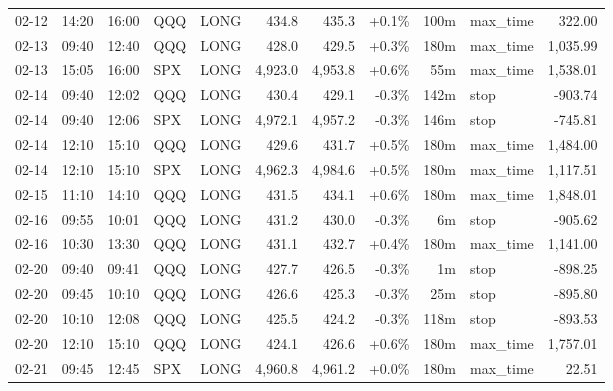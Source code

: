 \documentclass[11pt,a4paper,twoside]{article}
\begin{document}
\begin{center}
\begin{longtable}{>{\color{txtmain}}l l l l l r r r r >{\color{txtmain}}l r}
02-12 & 14:20 & 16:00 & QQQ & LONG & 434.8 & 435.3 & \textcolor{wingreen}{+0.1\%} & 100m & max\_time & \textcolor{wingreen}{322.00} \\
02-13 & 09:40 & 12:40 & QQQ & LONG & 428.0 & 429.5 & \textcolor{wingreen}{+0.3\%} & 180m & max\_time & \textcolor{wingreen}{1,035.99} \\
02-13 & 15:05 & 16:00 & SPX & LONG & 4,923.0 & 4,953.8 & \textcolor{wingreen}{+0.6\%} & 55m & max\_time & \textcolor{wingreen}{1,538.01} \\
02-14 & 09:40 & 12:02 & QQQ & LONG & 430.4 & 429.1 & \textcolor{lossred}{-0.3\%} & 142m & stop & \textcolor{lossred}{-903.74} \\
02-14 & 09:40 & 12:06 & SPX & LONG & 4,972.1 & 4,957.2 & \textcolor{lossred}{-0.3\%} & 146m & stop & \textcolor{lossred}{-745.81} \\
02-14 & 12:10 & 15:10 & QQQ & LONG & 429.6 & 431.7 & \textcolor{wingreen}{+0.5\%} & 180m & max\_time & \textcolor{wingreen}{1,484.00} \\
02-14 & 12:10 & 15:10 & SPX & LONG & 4,962.3 & 4,984.6 & \textcolor{wingreen}{+0.5\%} & 180m & max\_time & \textcolor{wingreen}{1,117.51} \\
02-15 & 11:10 & 14:10 & QQQ & LONG & 431.5 & 434.1 & \textcolor{wingreen}{+0.6\%} & 180m & max\_time & \textcolor{wingreen}{1,848.01} \\
02-16 & 09:55 & 10:01 & QQQ & LONG & 431.2 & 430.0 & \textcolor{lossred}{-0.3\%} & 6m & stop & \textcolor{lossred}{-905.62} \\
02-16 & 10:30 & 13:30 & QQQ & LONG & 431.1 & 432.7 & \textcolor{wingreen}{+0.4\%} & 180m & max\_time & \textcolor{wingreen}{1,141.00} \\
02-20 & 09:40 & 09:41 & QQQ & LONG & 427.7 & 426.5 & \textcolor{lossred}{-0.3\%} & 1m & stop & \textcolor{lossred}{-898.25} \\
02-20 & 09:45 & 10:10 & QQQ & LONG & 426.6 & 425.3 & \textcolor{lossred}{-0.3\%} & 25m & stop & \textcolor{lossred}{-895.80} \\
02-20 & 10:10 & 12:08 & QQQ & LONG & 425.5 & 424.2 & \textcolor{lossred}{-0.3\%} & 118m & stop & \textcolor{lossred}{-893.53} \\
02-20 & 12:10 & 15:10 & QQQ & LONG & 424.1 & 426.6 & \textcolor{wingreen}{+0.6\%} & 180m & max\_time & \textcolor{wingreen}{1,757.01} \\
02-21 & 09:45 & 12:45 & SPX & LONG & 4,960.8 & 4,961.2 & \textcolor{wingreen}{+0.0\%} & 180m & max\_time & \textcolor{wingreen}{22.51} \\

\end{longtable}
\end{center}
\end{document}
